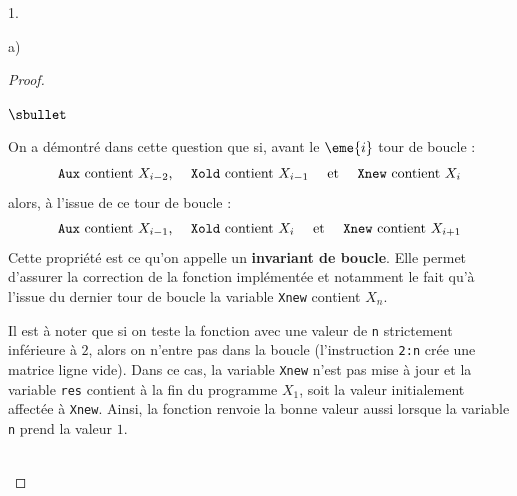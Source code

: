 \begin{noliste}{1.}
\begin{noliste}{a)}
\begin{proof}
\begin{remarkL}{.97}
\begin{noliste}{$\sbullet$}
        \item On a démontré dans cette question que si, avant le
          $\eme{i}$ tour de boucle : 
          \[
          \text{{\tt Aux} contient $X_{i-2}$, \quad {\tt Xold}
            contient $X_{i-1}$ \quad et \quad {\tt Xnew} contient
            $X_{i}$}
          \]
          alors, à l'issue de ce tour de boucle :
          \[
          \text{{\tt Aux} contient $X_{i-1}$, \quad {\tt Xold}
            contient $X_{i}$ \quad et \quad {\tt Xnew} contient
            $X_{i+1}$}
          \]
          Cette propriété est ce qu'on appelle un {\bf invariant de
            boucle}. Elle permet d'assurer la correction de la
          fonction implémentée et notamment le fait qu'à l'issue du
          dernier tour de boucle la variable {\tt Xnew} contient
          $X_n$.

        \item Il est à noter que si on teste la fonction avec une
          valeur de {\tt n} strictement inférieure à $2$, alors on
          n'entre pas dans la boucle (l'instruction {\tt 2:n} crée une
          matrice ligne vide). Dans ce cas, la variable {\tt Xnew}
          n'est pas mise à jour et la variable {\tt res} contient à la
          fin du programme $X_1$, soit la valeur initialement affectée
          à {\tt Xnew}. Ainsi, la fonction renvoie la bonne valeur
          aussi lorsque la variable {\tt n} prend la valeur $1$.
        \end{noliste}
      \end{remarkL}~\\[-1.2cm]
    \end{proof}


\end{noliste}
\end{noliste}
